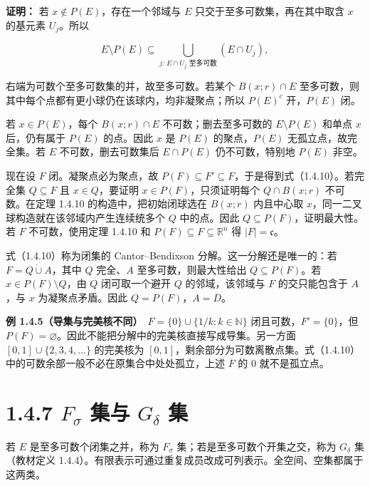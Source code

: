 \documentclass[11pt,a4paper]{article}
\begin{document}
\textbf{证明：} 若 \(x\notin P(E)\)，存在一个邻域与 \(E\)
只交于至多可数集，再在其中取含 \(x\) 的基元素 \(U_j\)。所以

\begin{equation*}
E\setminus P(E)
\subseteq\bigcup_{j:\,E\cap U_j\text{ 至多可数}}(E\cap U_j),
\tag{1.4.11}
\end{equation*}

右端为可数个至多可数集的并，故至多可数。若某个 \(B(x;r)\cap E\)
至多可数，则其中每个点都有更小球仍在该球内，均非凝聚点；所以 \(P(E)^c\)
开，\(P(E)\) 闭。

若 \(x\in P(E)\)，每个 \(B(x;r)\cap E\) 不可数；删去至多可数的
\(E\setminus P(E)\) 和单点 \(x\) 后，仍有属于 \(P(E)\) 的点。因此 \(x\)
是 \(P(E)\) 的聚点，\(P(E)\) 无孤立点，故完全集。若 \(E\)
不可数，删去可数集后 \(E\cap P(E)\) 仍不可数，特别地 \(P(E)\) 非空。

现在设 \(F\) 闭。凝聚点必为聚点，故
\(P(F)\subseteq F'\subseteq F\)，于是得到式（1.4.10）。若完全集
\(Q\subseteq F\) 且 \(x\in Q\)，要证明 \(x\in P(F)\)，只须证明每个
\(Q\cap B(x;r)\) 不可数。在定理 1.4.10 的构造中，把初始闭球选在
\(B(x;r)\) 内且中心取 \(x\)，同一二叉球构造就在该邻域内产生连续统多个
\(Q\) 中的点。因此 \(Q\subseteq P(F)\)，证明最大性。若 \(F\)
不可数，使用定理 1.4.10 和 \(P(F)\subseteq F\subseteq\mathbb R^n\) 得
\(|F|=\mathfrak c\)。

式（1.4.10）称为闭集的 Cantor--Bendixson 分解。这一分解还是唯一的：若
\(F=Q\mathbin{\dot\cup}A\)，其中 \(Q\) 完全、\(A\)
至多可数，则最大性给出 \(Q\subseteq P(F)\)。若
\(x\in P(F)\setminus Q\)，由 \(Q\) 闭可取一个避开 \(Q\) 的邻域，该邻域与
\(F\) 的交只能包含于 \(A\)，与 \(x\) 为凝聚点矛盾。因此
\(Q=P(F)\)，\(A=D\)。

\textbf{例
1.4.5（导集与完美核不同）}　\(F=\{0\}\cup\{1/k:k\in\mathbb N\}\)
闭且可数，\(F'=\{0\}\)，但
\(P(F)=\varnothing\)。因此不能把分解中的完美核直接写成导集。另一方面
\([0,1]\cup\{2,3,4,\ldots\}\) 的完美核为
\([0,1]\)，剩余部分为可数离散点集。式（1.4.10）中的可数余部一般不必在原集合中处处孤立，上述
\(F\) 的 \(0\) 就不是孤立点。

\section[\S{}1.4.7 \texorpdfstring{$F_\sigma$}{Fσ} 集与 \texorpdfstring{$G_\delta$}{Gδ}
集]{1.4.7 \texorpdfstring{$F_\sigma$}{Fσ} 集与 \texorpdfstring{$G_\delta$}{Gδ}
集}\label{fux3c3-ux96c6ux4e0e-gux3b4-ux96c6}

若 \(E\) 是至多可数个闭集之并，称为 \(F_\sigma\)
集；若是至多可数个开集之交，称为 \(G_\delta\) 集（教材定义
1.4.4）。有限表示可通过重复成员改成可列表示。全空间、空集都属于这两类。
\end{document}
